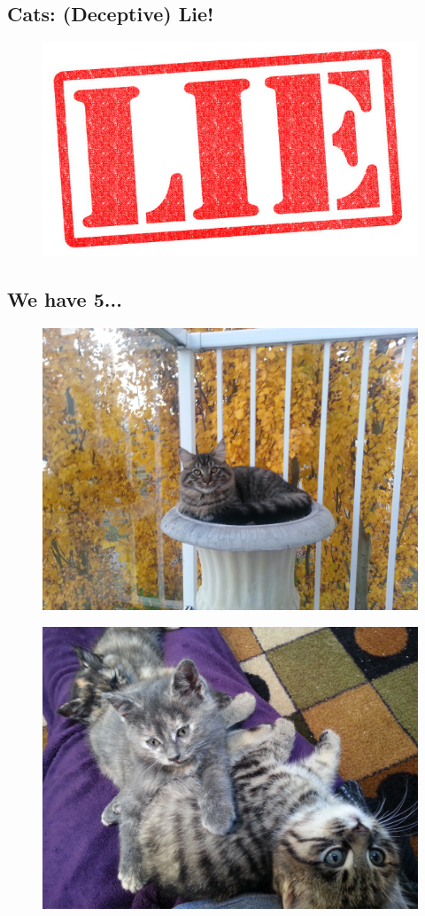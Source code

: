 \clearpage

\subsection*{Cats:  \color{red}  (Deceptive) Lie!}

\begin{figure}[h]
	\centering\includegraphics[width=0.4\linewidth]{images/lie.jpg}
\end{figure}

\clearpage

\subsection*{We have 5...}

\begin{figure}[h]
	\centering\includegraphics[width=0.5\linewidth]{images/creampuff.jpg}
\end{figure}

\clearpage

\begin{figure}[h]
	\centering\includegraphics[width=0.6\linewidth]{images/kittens.jpg}
\end{figure}

